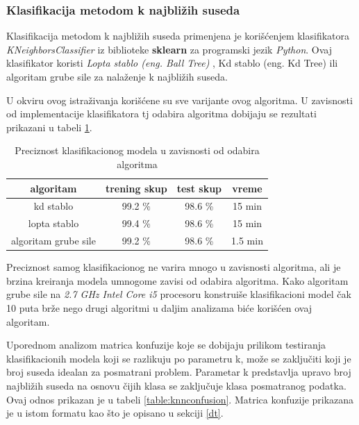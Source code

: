 \documentclass[a4paper]{article}
\begin{document}
\subsubsection{Klasifikacija metodom k najbližih suseda}
\label{ksusedasekcija}


Klasifikacija metodom k najbližih suseda primenjena je korišćenjem klasifikatora \textit{KNeighborsClassifier} iz biblioteke \textbf{sklearn} za programski jezik \textit{Python}. Ovaj klasifikator koristi  \textit{Lopta stablo (eng. Ball Tree)} , Kd stablo (eng. Kd Tree) ili algoritam grube sile za nalaženje k najbližih suseda.

U okviru ovog istraživanja korišćene su sve varijante ovog algoritma. U zavisnosti od implementacije klasifikatora tj odabira algoritma dobijaju se rezultati prikazani u tabeli \ref{table:algknn}.

\begin{table}[h!]
\centering
\begin{tabular}{|c c c c|} 
 \hline
  algoritam & trening skup & test skup & vreme 
  \\ [0.5ex] 
 \hline
 kd stablo & 99.2 \% & 98.6 \% & 15 min \\
 lopta stablo & 99.4 \% & 98.6 \% & 15 min \\
 algoritam grube sile & 99.2 \% & 98.6 \% & 1.5 min \\
 \hline
\end{tabular}
\caption{Preciznost klasifikacionog modela u zavisnosti od odabira algoritma}
\label{table:algknn}
\end{table}

Preciznost samog klasifikacionog ne varira mnogo u zavisnosti algoritma, ali je brzina kreiranja modela umnogome zavisi od odabira algoritma. Kako algoritam grube sile na \textit{2.7 GHz Intel Core i5} procesoru konstruiše klasifikacioni model čak 10 puta brže nego drugi algoritmi u daljim analizama biće korišćen ovaj algoritam.

Uporednom analizom matrica konfuzije koje se dobijaju prilikom testiranja klasifikacionih modela koji se razlikuju po parametru k, može se zaključiti koji je broj suseda idealan za posmatrani problem. Parametar k predstavlja upravo broj najbližih suseda na osnovu čijih klasa se zaključuje klasa posmatranog podatka. Ovaj odnos prikazan je u tabeli \ref{table:knnconfusion}. Matrica konfuzije prikazana je u istom formatu kao što je opisano u sekciji \ref{dt}.
\end{document}
